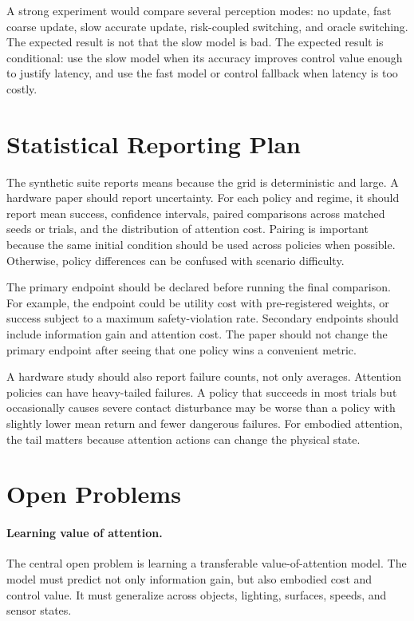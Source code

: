 \documentclass{article}
\begin{document}
A strong experiment would compare several perception modes: no update, fast
coarse update, slow accurate update, risk-coupled switching, and oracle
switching. The expected result is not that the slow model is bad. The expected
result is conditional: use the slow model when its accuracy improves control
value enough to justify latency, and use the fast model or control fallback
when latency is too costly.

\section{Statistical Reporting Plan}

The synthetic suite reports means because the grid is deterministic and large.
A hardware paper should report uncertainty. For each policy and regime, it
should report mean success, confidence intervals, paired comparisons across
matched seeds or trials, and the distribution of attention cost. Pairing is
important because the same initial condition should be used across policies
when possible. Otherwise, policy differences can be confused with scenario
difficulty.

The primary endpoint should be declared before running the final comparison.
For example, the endpoint could be utility cost with pre-registered weights,
or success subject to a maximum safety-violation rate. Secondary endpoints
should include information gain and attention cost. The paper should not
change the primary endpoint after seeing that one policy wins a convenient
metric.

A hardware study should also report failure counts, not only averages.
Attention policies can have heavy-tailed failures. A policy that succeeds in
most trials but occasionally causes severe contact disturbance may be worse
than a policy with slightly lower mean return and fewer dangerous failures.
For embodied attention, the tail matters because attention actions can change
the physical state.

\section{Open Problems}

\paragraph{Learning value of attention.}
The central open problem is learning a transferable value-of-attention model.
The model must predict not only information gain, but also embodied cost and
control value. It must generalize across objects, lighting, surfaces, speeds,
and sensor states.
\end{document}
